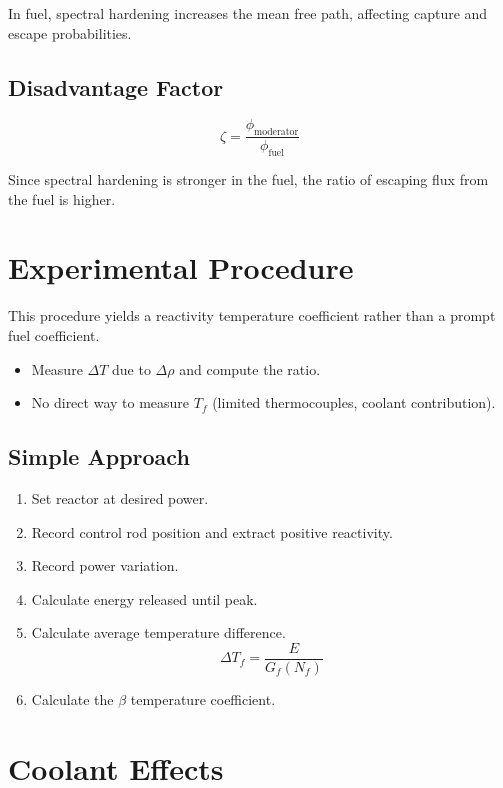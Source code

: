 In fuel, spectral hardening increases the mean free path, affecting capture and escape probabilities.

\subsection{Disadvantage Factor}
\begin{equation}
    \zeta = \frac{\phi_{\text{moderator}}}{\phi_{\text{fuel}}}
\end{equation}

Since spectral hardening is stronger in the fuel, the ratio of escaping flux from the fuel is higher.

\section{Experimental Procedure}

This procedure yields a reactivity temperature coefficient rather than a prompt fuel coefficient.

\begin{itemize}
    \item Measure $\Delta T$ due to $\Delta \rho$ and compute the ratio.
    \item No direct way to measure $T_f$ (limited thermocouples, coolant contribution).
\end{itemize}

\subsection{Simple Approach}
\begin{enumerate}
    \item Set reactor at desired power.
    \item Record control rod position and extract positive reactivity.
    \item Record power variation.
    \item Calculate energy released until peak.
    \item Calculate average temperature difference.
    \begin{equation}
        \Delta T_f = \frac{E}{G_f(N_f)}
    \end{equation}
    \item Calculate the $\beta$ temperature coefficient.
\end{enumerate}

\section{Coolant Effects}

